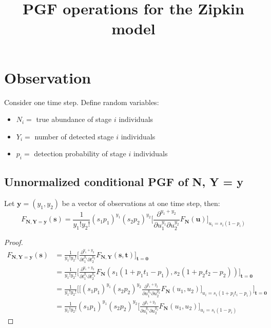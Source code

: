 \documentclass{article}
\title{PGF operations for the Zipkin model}
\begin{document}
\maketitle

\section{Observation}

Consider one time step. Define random variables:
\begin{itemize}
\item $N_i =$ true abundance of stage $i$ individuals
\item $Y_i =$ number of detected stage $i$ individuals
\item $p_i =$ detection probability of stage $i$ individuals
\end{itemize}

\subsection{Unnormalized conditional PGF of N, Y = y}
Let $\mathbf{y} = (y_1, y_2)$ be a vector of observations at one time step, then:
$$F_{\mathbf{N}, \mathbf{Y} = \mathbf{y}}(\mathbf{s}) = \frac{1}{y_1!y_2!} (s_1p_1)^{y_1} (s_2p_2)^{y_2} \bigg [\frac{\partial^{y_1+y_2}}{\partial u_1^{y_1} \partial u_2^{y_2}} F_{\mathbf{N}}(\mathbf{u}) \bigg]_{u_i = s_i(1-p_i)}$$

\begin{proof}
\begin{align*}
F_{\mathbf{N}, \mathbf{Y} = \mathbf{y}}(\mathbf{s})
&= \frac{1}{y_1!y_2!} \bigg[\frac{\partial^{y_1+y_2}}{\partial t_1^{y_1} \partial t_2^{y_2}} F_{\mathbf{N}, \mathbf{Y}}(\mathbf{s}, \mathbf{t}) \bigg]_{\mathbf{t} = \mathbf{0}} \\
&= \frac{1}{y_1!y_2!} \bigg[\frac{\partial^{y_1+y_2}}{\partial t_1^{y_1} \partial t_2^{y_2}} F_{\mathbf{N}}(s_1(1+p_1t_1-p_1), s_2(1+p_2t_2-p_2)) \bigg]_{\mathbf{t} = \mathbf{0}} \\
&= \frac{1}{y_1!y_2!} \bigg[ \bigg[ (s_1p_1)^{y_1} (s_2p_2)^{y_2} \frac{\partial^{y_1+y_2}}{\partial u_1^{y_1} \partial u_2^{y_2}} F_{\mathbf{N}}(u_1, u_2) \bigg]_{u_i = s_i(1+p_it_i-p_i)} \bigg]_{\mathbf{t} = \mathbf{0}} \\
&= \frac{1}{y_1!y_2!} (s_1p_1)^{y_1} (s_2p_2)^{y_2} \bigg[ \frac{\partial^{y_1+y_2}}{\partial u_1^{y_1} \partial u_2^{y_2}} F_{\mathbf{N}}(u_1, u_2) \bigg]_{u_i = s_i(1-p_i)}
\end{align*}
\end{proof}
\end{document}
